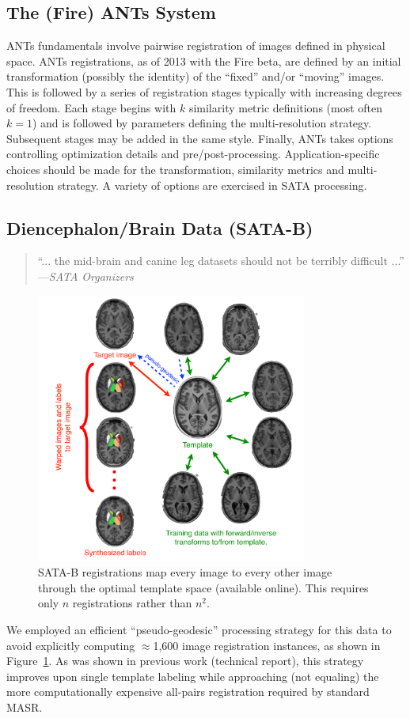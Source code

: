 \documentclass{llncs}
\begin{document}
\subsection{The (Fire) ANTs System} ANTs fundamentals involve pairwise
registration of images defined in physical space.  ANTs registrations,
as of 2013 with the Fire beta, are defined by an initial transformation (possibly the
identity) of the ``fixed'' and/or ``moving'' images.  This is followed
by a series of registration stages typically with increasing degrees
of freedom.  Each stage begins with $k$ similarity metric definitions
(most often $k=1$) and is followed by parameters defining the
multi-resolution strategy.  Subsequent stages may be added in the same
style.  Finally, ANTs takes options controlling optimization details
and pre/post-processing.  Application-specific choices should be made
for the transformation, similarity metrics and multi-resolution
strategy.  A variety of options are exercised in SATA processing.

\subsection{Diencephalon/Brain Data (SATA-B)}
 \begin{quote}
 ``... the mid-brain and canine leg
  datasets should not be terribly difficult ...'' ---{\em SATA Organizers}
\end{quote}
\begin{figure}[t]
 \centering 
  \includegraphics[width=3.5in]{../figs/SATA_diencephalon.pdf}
 \caption{SATA-B registrations map every image to every other image
   through the optimal template space (available online).  This
   requires only $n$ registrations rather than $n^2$.}
 \label{fig:Bmethods}
\end{figure}
We employed an efficient ``pseudo-geodesic'' processing strategy for this data to
avoid explicitly computing $\approx$1,600 image registration
instances, as shown in Figure~\ref{fig:Bmethods}.  As was shown in previous work (technical report), this
strategy improves upon single template labeling while approaching (not
equaling) the more computationally expensive all-pairs
registration required by standard MASR.
\end{document}
